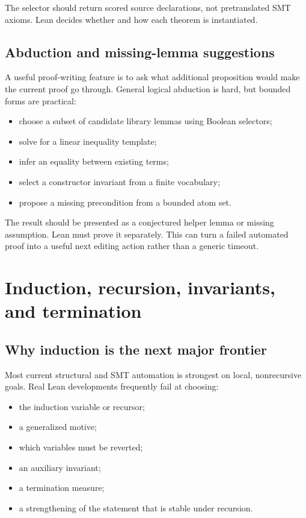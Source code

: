 \documentclass[11pt,letterpaper,openany]{report}
\begin{document}
The selector should return scored source declarations, not pretranslated SMT axioms.
Lean decides whether and how each theorem is instantiated.

\section{Abduction and missing-lemma suggestions}

A useful proof-writing feature is to ask what additional proposition would make the
current proof go through. General logical abduction is hard, but bounded forms are
practical:

\begin{itemize}
  \item choose a subset of candidate library lemmas using Boolean selectors;
  \item solve for a linear inequality template;
  \item infer an equality between existing terms;
  \item select a constructor invariant from a finite vocabulary;
  \item propose a missing precondition from a bounded atom set.
\end{itemize}

The result should be presented as a conjectured helper lemma or missing assumption.
Lean must prove it separately. This can turn a failed automated proof into a useful
next editing action rather than a generic timeout.

\chapter{Induction, recursion, invariants, and termination}
\label{ch:induction}

\section{Why induction is the next major frontier}

Most current structural and SMT automation is strongest on local, nonrecursive goals.
Real Lean developments frequently fail at choosing:

\begin{itemize}
  \item the induction variable or recursor;
  \item a generalized motive;
  \item which variables must be reverted;
  \item an auxiliary invariant;
  \item a termination measure;
  \item a strengthening of the statement that is stable under recursion.
\end{itemize}
\end{document}
